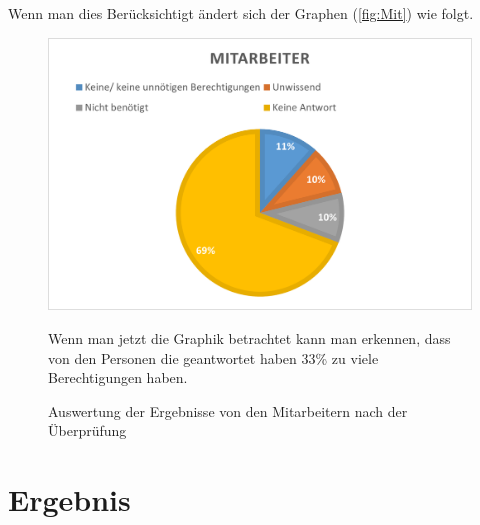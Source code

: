 \newline
Wenn man dies Berücksichtigt ändert sich der Graphen (\ref{fig:Mit}) wie folgt.
\begin{figure}[h!]
 \centering
 \includegraphics[width=1\textwidth]{gfx/Picture/Mitarbeiter(korregiert).PNG}
 \caption{Auswertung der Ergebnisse von den Mitarbeitern nach der Überprüfung}
 \label{fig:MitPruf}
Wenn man jetzt die Graphik betrachtet kann man erkennen, dass von den Personen die geantwortet haben 33\% zu viele Berechtigungen haben.

\end{figure}
\section{Ergebnis}
\label{sec:Ergebnis}